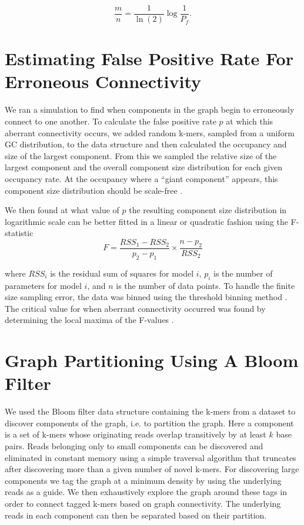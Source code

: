 \documentclass{pnastwo}
\begin{document}
\begin{article}
\begin{materials}
\begin{displaymath}
\frac{m}{n} = \frac{1}{\ln(2)} \log{\frac{1}{P_f}}.
\end{displaymath}

\section{Estimating False Positive Rate For Erroneous Connectivity}
We ran a simulation to find when components in the graph 
begin to erroneously connect to one another.
To calculate the false positive rate $p$ at which this aberrant 
connectivity occurs, 
we added random k-mers, sampled from a uniform GC distribution, to the data structure 
and then calculated the occupancy and size of 
the largest 
component. From this we sampled the relative size of 
the largest component and the overall component size distribution for each
given occupancy rate.
At the occupancy where a ``giant component'' appears, this component size distribution 
should be scale-free \cite{stauffer1979scaling}. 

We then found at what value of $p$ the resulting 
component size distribution in logarithmic 
scale can be better fitted in a linear or quadratic fashion using 
the F-statistic
\newline
\newline
\begin{displaymath}
F=\frac{RSS_1-RSS_2}{p_2-p_1} \times \frac{n - p_2}{RSS_2}
\end{displaymath}

where $RSS_i$ is the residual sum of squares for model $i$, $p_i$ is 
the number of parameters for model $i$, and $n$ is the number of data 
points. To handle the finite size sampling error, the data was binned using the 
threshold binning method \cite{adami2002critical}. The critical value for 
when aberrant connectivity occurred was found by determining the local maxima 
of the F-values \cite{wald43}.

\section{Graph Partitioning Using A Bloom Filter}

We used the Bloom filter data structure containing the k-mers from a
dataset to discover components of the graph, i.e. to partition the
graph.  Here a component is a set of k-mers whose originating reads
overlap transitively by at least $k$ base pairs.  Reads belonging only
to small components can be discovered and eliminated in constant
memory using a simple traversal algorithm that truncates after
discovering more than a given number of novel k-mers.  For discovering
large components we tag the graph at a minimum density by using the
underlying reads as a guide.  We then exhaustively explore the graph
around these tags in order to connect tagged k-mers based on graph
connectivity.  The underlying reads in each component can then be
separated based on their partition.


\end{materials}
\end{article}
\end{document}
